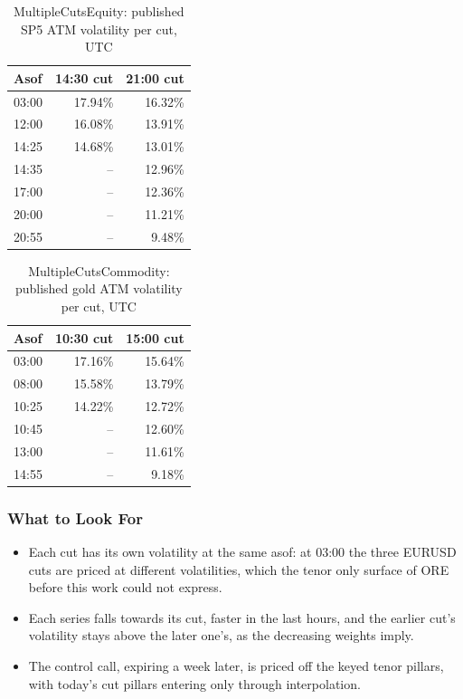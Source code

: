 \documentclass[12pt, a4paper]{article}
\begin{document}
\begin{table}[H]
\centering
\begin{tabular}{|l|r|r|}
\hline
Asof & 14:30 cut & 21:00 cut \\
\hline
03:00 & 17.94\% & 16.32\% \\
12:00 & 16.08\% & 13.91\% \\
14:25 & 14.68\% & 13.01\% \\
14:35 & -- & 12.96\% \\
17:00 & -- & 12.36\% \\
20:00 & -- & 11.21\% \\
20:55 & -- & 9.48\% \\
\hline
\end{tabular}
\caption{MultipleCutsEquity: published SP5 ATM volatility per cut, UTC}
\label{tab:mceq}
\end{table}

\begin{table}[H]
\centering
\begin{tabular}{|l|r|r|}
\hline
Asof & 10:30 cut & 15:00 cut \\
\hline
03:00 & 17.16\% & 15.64\% \\
08:00 & 15.58\% & 13.79\% \\
10:25 & 14.22\% & 12.72\% \\
10:45 & -- & 12.60\% \\
13:00 & -- & 11.61\% \\
14:55 & -- & 9.18\% \\
\hline
\end{tabular}
\caption{MultipleCutsCommodity: published gold ATM volatility per cut, UTC}
\label{tab:mcco}
\end{table}

\subsubsection*{What to Look For}

\begin{itemize}
\item Each cut has its own volatility at the same asof: at 03:00 the three EURUSD cuts are priced at different
  volatilities, which the tenor only surface of ORE before this work could not express.
\item Each series falls towards its cut, faster in the last hours, and the earlier cut's volatility stays above the
  later one's, as the decreasing weights imply.
\item The control call, expiring a week later, is priced off the keyed tenor pillars, with today's cut pillars entering
  only through interpolation.
\end{itemize}
\end{document}
